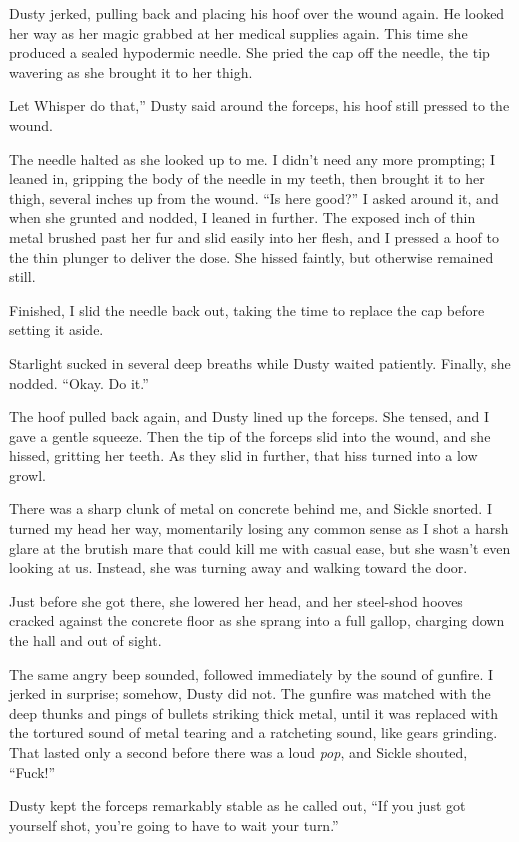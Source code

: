 Dusty jerked, pulling back and placing his hoof over the wound again. He looked her way as her magic grabbed at her medical supplies again. This time she produced a sealed hypodermic needle. She pried the cap off the needle, the tip wavering as she brought it to her thigh.

\leavevmode{}Let Whisper do that,” Dusty said around the forceps, his hoof still pressed to the wound.

The needle halted as she looked up to me. I didn’t need any more prompting; I leaned in, gripping the body of the needle in my teeth, then brought it to her thigh, several inches up from the wound. “Is here good?” I asked around it, and when she grunted and nodded, I leaned in further. The exposed inch of thin metal brushed past her fur and slid easily into her flesh, and I pressed a hoof to the thin plunger to deliver the dose. She hissed faintly, but otherwise remained still.

Finished, I slid the needle back out, taking the time to replace the cap before setting it aside.

Starlight sucked in several deep breaths while Dusty waited patiently. Finally, she nodded. “Okay. Do it.”

The hoof pulled back again, and Dusty lined up the forceps. She tensed, and I gave a gentle squeeze. Then the tip of the forceps slid into the wound, and she hissed, gritting her teeth. As they slid in further, that hiss turned into a low growl.

There was a sharp clunk of metal on concrete behind me, and Sickle snorted. I turned my head her way, momentarily losing any common sense as I shot a harsh glare at the brutish mare that could kill me with casual ease, but she wasn’t even looking at us. Instead, she was turning away and walking toward the door.

Just before she got there, she lowered her head, and her steel-shod hooves cracked against the concrete floor as she sprang into a full gallop, charging down the hall and out of sight.

The same angry beep sounded, followed immediately by the sound of gunfire. I jerked in surprise; somehow, Dusty did not. The gunfire was matched with the deep thunks and pings of bullets striking thick metal, until it was replaced with the tortured sound of metal tearing and a ratcheting sound, like gears grinding. That lasted only a second before there was a loud \textit{pop}, and Sickle shouted, “Fuck!”

Dusty kept the forceps remarkably stable as he called out, “If you just got yourself shot, you’re going to have to wait your turn.”

